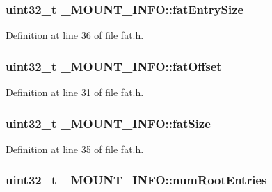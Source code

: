 \subsubsection[{\texorpdfstring{fat\+Entry\+Size}{fatEntrySize}}]{\setlength{\rightskip}{0pt plus 5cm}uint32\+\_\+t \+\_\+\+M\+O\+U\+N\+T\+\_\+\+I\+N\+F\+O\+::fat\+Entry\+Size}\hypertarget{struct__MOUNT__INFO_ade01217e0a9e58634a65b1279bbe95c6}{}\label{struct__MOUNT__INFO_ade01217e0a9e58634a65b1279bbe95c6}


Definition at line 36 of file fat.\+h.

\subsubsection[{\texorpdfstring{fat\+Offset}{fatOffset}}]{\setlength{\rightskip}{0pt plus 5cm}uint32\+\_\+t \+\_\+\+M\+O\+U\+N\+T\+\_\+\+I\+N\+F\+O\+::fat\+Offset}\hypertarget{struct__MOUNT__INFO_a1aa114acfe01f60c8a85fe7a01d5c96d}{}\label{struct__MOUNT__INFO_a1aa114acfe01f60c8a85fe7a01d5c96d}


Definition at line 31 of file fat.\+h.

\subsubsection[{\texorpdfstring{fat\+Size}{fatSize}}]{\setlength{\rightskip}{0pt plus 5cm}uint32\+\_\+t \+\_\+\+M\+O\+U\+N\+T\+\_\+\+I\+N\+F\+O\+::fat\+Size}\hypertarget{struct__MOUNT__INFO_a1c27dc07d9399da26e9836433514537e}{}\label{struct__MOUNT__INFO_a1c27dc07d9399da26e9836433514537e}


Definition at line 35 of file fat.\+h.

\subsubsection[{\texorpdfstring{num\+Root\+Entries}{numRootEntries}}]{\setlength{\rightskip}{0pt plus 5cm}uint32\+\_\+t \+\_\+\+M\+O\+U\+N\+T\+\_\+\+I\+N\+F\+O\+::num\+Root\+Entries}\hypertarget{struct__MOUNT__INFO_afacdf709c99a10da00c6859acd935334}{}\label{struct__MOUNT__INFO_afacdf709c99a10da00c6859acd935334}


